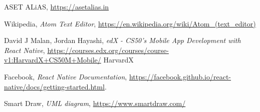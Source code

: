 \begin{thebibliography}{99}

  ASET ALiAS,
  \url{https://asetalias.in}
  
  Wikipedia,
  \emph{Atom Text Editor},
  \url{https://en.wikipedia.org/wiki/Atom_(text_editor)}
  
  {David J Malan, Jordan Hayashi,}
  \emph{edX - CS50's Mobile App Development with React Native},
  \url{https://courses.edx.org/courses/course-v1:HarvardX+CS50M+Mobile/}
  HarvardX

  Facebook,
  \emph{React Native Documentation},
  \url{https://facebook.github.io/react-native/docs/getting-started.html}.

  Smart Draw,
  \emph{UML diagram},
  \url{https://www.smartdraw.com/}

\end{thebibliography}
